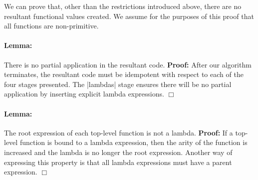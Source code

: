 \documentclass[preprint]{sigplanconf}
\begin{document}
We can prove that, other than the restrictions introduced above, there are no resultant functional values created. We assume for the purposes of this proof that all functions are non-primitive.

\newenvironment{lemma}[1]
    {\paragraph{Lemma:} #1 \textbf{Proof:} }
    {\hfill$\Box$}

\begin{lemma}{There is no partial application in the resultant code.}
After our algorithm terminates, the resultant code must be idempotent with respect to each of the four stages presented. The |lambdas| stage ensures there will be no partial application by inserting explicit lambda expressions.
\end{lemma}

\begin{lemma}{The root expression of each top-level function is not a lambda.}
If a top-level function is bound to a lambda expression, then the arity of the function is increased and the lambda is no longer the root expression. Another way of expressing this property is that all lambda expressions must have a parent expression.
\end{lemma}
\end{document}
